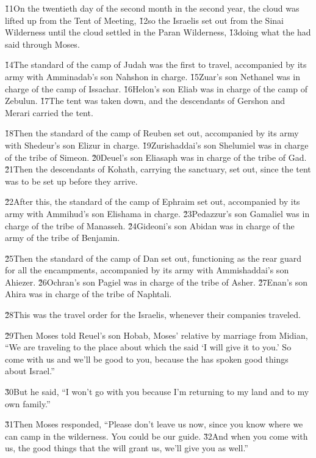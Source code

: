 \v{11}On the twentieth day of the second month in the second year, the cloud was lifted up from the Tent of Meeting, \v{12}so the Israelis set out from the Sinai Wilderness until the cloud settled in the Paran Wilderness, \v{13}doing what the  had said through Moses.

\v{14}The standard of the camp of Judah was the first to travel, accompanied by its army with Amminadab's son Nahshon in charge. \v{15}Zuar's son Nethanel was in charge of the camp of Issachar. \v{16}Helon's son Eliab was in charge of the camp of Zebulun. \v{17}The tent was taken down, and the descendants of Gershon and Merari carried the tent.

\v{18}Then the standard of the camp of Reuben set out, accompanied by its army with Shedeur's son Elizur in charge. \v{19}Zurishaddai's son Shelumiel was in charge of the tribe of Simeon. \v{20}Deuel's son Eliasaph was in charge of the tribe of Gad. \v{21}Then the descendants of Kohath, carrying the sanctuary, set out, since the tent was to be set up before they arrive.

\v{22}After this, the standard of the camp of Ephraim set out, accompanied by its army with Ammihud's son Elishama in charge. \v{23}Pedazzur's son Gamaliel was in charge of the tribe of Manasseh. \v{24}Gideoni's son Abidan was in charge of the army of the tribe of Benjamin.

\v{25}Then the standard of the camp of Dan set out, functioning as the rear guard for all the encampments, accompanied by its army with Ammishaddai's son Ahiezer. \v{26}Ochran's son Pagiel was in charge of the tribe of Asher. \v{27}Enan's son Ahira was in charge of the tribe of Naphtali.

\v{28}This was the travel order for the Israelis, whenever their companies traveled.

\v{29}Then Moses told Reuel's son Hobab, Moses' relative by marriage from Midian, ``We are traveling to the place about which the  said `I will give it to you.' So come with us and we'll be good to you, because the  has spoken good things about Israel.''

\v{30}But he said, ``I won't go with you because I'm returning to my land and to my own family.''

\v{31}Then Moses responded, ``Please don't leave us now, since you know where we can camp in the wilderness. You could be our guide. \v{32}And when you come with us, the good things that the  will grant us, we'll give you as well.''

